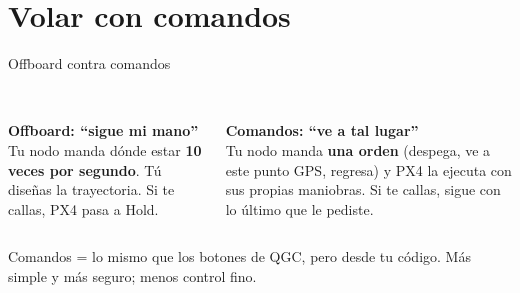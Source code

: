 \section{Volar con comandos}

\begin{frame}{Offboard contra comandos}
  \begin{columns}[t]
    \centering
    \\[0.3em]
    \textbf{Offboard: ``sigue mi mano''}\\[0.2em]
    \small Tu nodo manda dónde estar \textbf{10 veces por segundo}. Tú diseñas la trayectoria. Si te callas,
    PX4 pasa a Hold.
    \centering
    \\[0.3em]
    \textbf{Comandos: ``ve a tal lugar''}\\[0.2em]
    \small Tu nodo manda \textbf{una orden} (despega, ve a este punto GPS, regresa) y PX4 la ejecuta con sus
    propias maniobras. Si te callas, sigue con lo último que le pediste.
  \end{columns}
  \vspace{0.6em}
  \begin{idea}
    \small Comandos = lo mismo que los botones de QGC, pero desde tu código. Más simple y más seguro; menos
    control fino.
  \end{idea}
\end{frame}

